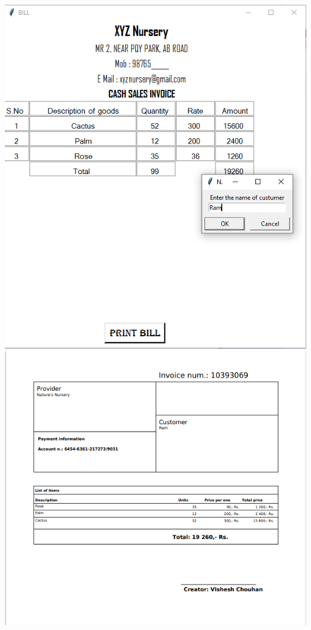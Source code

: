 \documentclass[11pt,a4paper]{article}
\begin{document}
\includegraphics{output8.png}\\
\includegraphics{output9.png}\\
\end{document}
